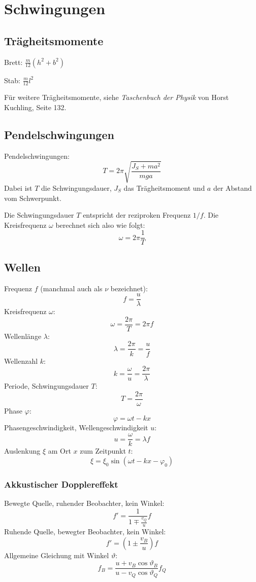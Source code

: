 \section{Schwingungen}

\subsection{Trägheitsmomente}

Brett: $\displaystyle\frac{m}{12} \left(h^2 + b^2\right)$

Stab: $\displaystyle\frac{m}{12} l^2$

Für weitere Trägheitsmomente, siehe \textit{Taschenbuch der Physik} von Horst
Kuchling, Seite 132.

\subsection{Pendelschwingungen}

Pendelschwingungen:
\[
	T = 2 \pi \sqrt{\frac{J_S + ma^2}{mga}}	
\]
Dabei ist $T$ die Schwingungsdauer, $J_S$ das Trägheitsmoment und $a$ der
Abstand vom Schwerpunkt.

Die Schwingungsdauer $T$ entspricht der reziproken Frequenz $1/f$. Die
Kreisfrequenz $\omega$ berechnet sich also wie folgt:
\[
	\omega = 2\pi\frac{1}{T}
\]

\subsection{Wellen}



Frequenz $f$ (manchmal auch als $\nu$ bezeichnet):
\[
	f = \frac{u}{\lambda}
\]
Kreisfrequenz $\omega$:
\[
	\omega = \frac{2 \pi}{T} = 2 \pi f
\]
Wellenlänge $\lambda$:
\[
	\lambda = \frac{2 \pi}{k} = \frac{u}{f}
\]
Wellenzahl $k$:
\[
k = \frac{\omega}{u} = \frac{2 \pi}{\lambda}
\]
Periode, Schwingungsdauer $T$:
\[
	T = \frac{2 \pi}{\omega}
\]
Phase $\varphi$:
\[
	\varphi = \omega t - k x
\]
Phasengeschwindigkeit, Wellengeschwindigkeit $u$:
\[
	u = \frac{\omega}{k} = \lambda f
\]
Auslenkung $\xi$ am Ort $x$ zum Zeitpunkt $t$:
\[
	\xi = \xi_0 \sin (\omega t - k x - \varphi_0)
\]

\subsubsection{Akkustischer Dopplereffekt}

Bewegte Quelle, ruhender Beobachter, kein Winkel:
\[
	f' = \frac{1}{1 \mp \frac{v_Q}{u}} f
\]
Ruhende Quelle, bewegter Beobachter, kein Winkel:
\[
	f' = (1 \pm \frac{v_B}{u}) f
\]
Allgemeine Gleichung mit Winkel $\vartheta$:
\[
	f_B = \frac{u + v_B \cos \vartheta_B}{u - v_Q \cos \vartheta_Q} f_Q
\]
